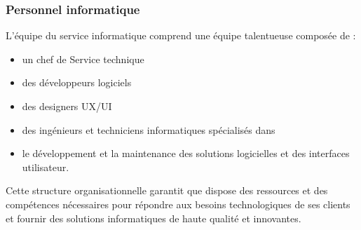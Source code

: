 \subsubsection{Personnel informatique}
L’équipe du service informatique comprend une équipe talentueuse composée de :
\begin{itemize}
  \item un chef de Service technique
  \item des développeurs logiciels
  \item des designers UX/UI
  \item des ingénieurs et techniciens informatiques spécialisés dans
  \item le développement et la maintenance des solutions logicielles et des interfaces utilisateur.
\end{itemize}


Cette structure organisationnelle garantit que \firm dispose des ressources
et des compétences nécessaires pour répondre aux besoins technologiques de ses
clients et fournir des solutions informatiques de haute qualité et innovantes.


